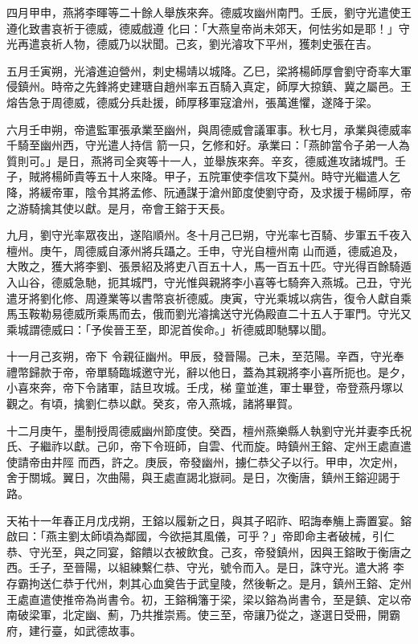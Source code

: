 \begin{pinyinscope}
 四月甲申，燕將李暉等二十餘人舉族來奔。德威攻幽州南門。壬辰，劉守光遣使王遵化致書哀祈于德威，德威戲遵
 化曰：「大燕皇帝尚未郊天，何怯劣如是耶！」守光再遣哀祈人物，德威乃以狀聞。己亥，劉光濬攻下平州，獲刺史張在吉。



 五月壬寅朔，光濬進迫營州，刺史楊靖以城降。乙巳，梁將楊師厚會劉守奇率大軍侵鎮州。時帝之先鋒將史建瑭自趙州率五百騎入真定，師厚大掠鎮、冀之屬邑。王熔告急于周德威，德威分兵赴援，師厚移軍寇滄州，張萬進懼，遂降于梁。



 六月壬申朔，帝遣監軍張承業至幽州，與周德威會議軍事。秋七月，承業與德威率千騎至幽州西，守光遣人持信
 箭一只，乞修和好。承業曰：「燕帥當令子弟一人為質則可。」是日，燕將司全爽等十一人，並舉族來奔。辛亥，德威進攻諸城門。壬子，賊將楊師貴等五十人來降。甲子，五院軍使李信攻下莫州。時守光繼遣人乞降，將緩帝軍，陰令其將孟修、阮通謀于滄州節度使劉守奇，及求援于楊師厚，帝之游騎擒其使以獻。是月，帝會王鎔于天長。



 九月，劉守光率眾夜出，遂陷順州。冬十月己巳朔，守光率七百騎、步軍五千夜入檀州。庚午，周德威自涿州將兵躡之。壬申，守光自檀州南
 山而遁，德威追及，大敗之，獲大將李劉、張景紹及將吏八百五十人，馬一百五十匹。守光得百餘騎遁入山谷，德威急馳，扼其城門，守光惟與親將李小喜等七騎奔入燕城。己丑，守光遣牙將劉化修、周遵業等以書幣哀祈德威。庚寅，守光乘城以病告，復令人獻自乘馬玉鞍勒易德威所乘馬而去，俄而劉光濬擒送守光偽殿直二十五人于軍門。守光又乘城謂德威曰：「予俟晉王至，即泥首俟命。」祈德威即馳驛以聞。



 十一月己亥朔，帝下
 令親征幽州。甲辰，發晉陽。己未，至范陽。辛酉，守光奉禮幣歸款于帝，帝單騎臨城邀守光，辭以他日，蓋為其親將李小喜所扼也。是夕，小喜來奔，帝下令諸軍，詰旦攻城。壬戌，梯童並進，軍士畢登，帝登燕丹塚以觀之。有頃，擒劉仁恭以獻。癸亥，帝入燕城，諸將畢賀。



 十二月庚午，墨制授周德威幽州節度使。癸酉，檀州燕樂縣人執劉守光并妻李氏祝氏、子繼祚以獻。己卯，帝下令班師，自雲、代而旋。時鎮州王鎔、定州王處直遣使請帝由井陘
 而西，許之。庚辰，帝發幽州，擄仁恭父子以行。甲申，次定州，舍于關城。翼日，次曲陽，與王處直謁北嶽祠。是日，次衡唐，鎮州王鎔迎謁于路。



 天祐十一年春正月戊戌朔，王鎔以履新之日，與其子昭祚、昭誨奉觴上壽置宴。鎔啟曰：「燕主劉太師頃為鄰國，今欲挹其風儀，可乎？」帝即命主者破械，引仁恭、守光至，與之同宴，鎔饋以衣被飲食。己亥，帝發鎮州，因與王鎔畋于衡唐之西。壬子，至晉陽，以組練繫仁恭、守光，號令而入。是日，誅守光。遣大將
 李存霸拘送仁恭于代州，刺其心血奠告于武皇陵，然後斬之。是月，鎮州王鎔、定州王處直遣使推帝為尚書令。初，王鎔稱籓于梁，梁以鎔為尚書令，至是鎮、定以帝南破梁軍，北定幽、薊，乃共推崇焉。使三至，帝讓乃從之，遂選日受冊，開霸府，建行臺，如武德故事。




\end{pinyinscope}

